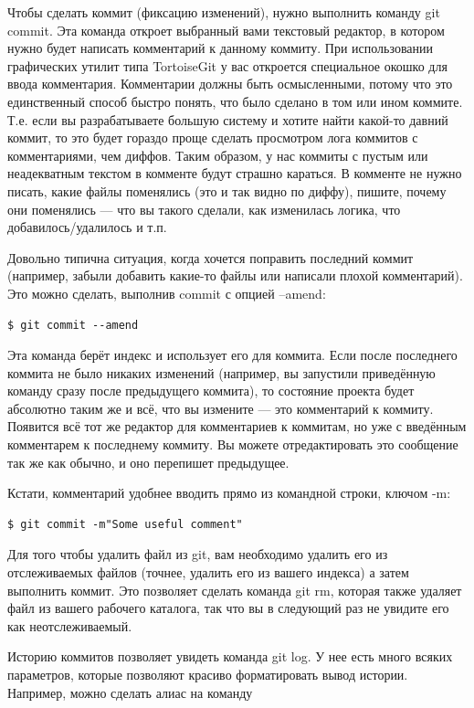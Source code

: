 \documentclass[a5paper]{article}
\begin{document}
Чтобы сделать коммит (фиксацию изменений), нужно выполнить команду git commit. Эта команда откроет выбранный вами текстовый редактор, в котором нужно будет написать комментарий к данному коммиту. При использовании графических утилит типа TortoiseGit у вас откроется специальное окошко для ввода комментария. Комментарии должны быть осмысленными, потому что это единственный способ быстро понять, что было сделано в том или ином коммите. Т.е. если вы разрабатываете большую систему и хотите найти какой-то давний коммит, то это будет гораздо проще сделать просмотром лога коммитов с комментариями, чем диффов. Таким образом, у нас коммиты с пустым или неадекватным текстом в комменте будут страшно караться. В комменте не нужно писать, какие файлы поменялись (это и так видно по диффу), пишите, почему они поменялись --- что вы такого сделали, как изменилась логика, что добавилось/удалилось и т.п.

Довольно типична ситуация, когда хочется поправить последний коммит (например, забыли добавить какие-то файлы или написали плохой комментарий). Это можно сделать, выполнив commit с опцией --amend:

\begin{verbatim}
$ git commit --amend
\end{verbatim}

Эта команда берёт индекс и использует его для коммита. Если после последнего коммита не было никаких изменений (например, вы запустили приведённую команду сразу после предыдущего коммита), то состояние проекта будет абсолютно таким же и всё, что вы измените --- это комментарий к коммиту. Появится всё тот же редактор для комментариев к коммитам, но уже с введённым комментарем к последнему коммиту. Вы можете отредактировать это сообщение так же как обычно, и оно перепишет предыдущее.

Кстати, комментарий удобнее вводить прямо из командной строки, ключом -m:

\begin{verbatim}
$ git commit -m"Some useful comment"
\end{verbatim}

Для того чтобы удалить файл из git, вам необходимо удалить его из отслеживаемых файлов (точнее, удалить его из вашего индекса) а затем выполнить коммит. Это позволяет сделать команда git rm, которая также удаляет файл из вашего рабочего каталога, так что вы в следующий раз не увидите его как неотслеживаемый.

Историю коммитов позволяет увидеть команда git log. У нее есть много всяких параметров, которые позволяют красиво форматировать вывод истории. Например, можно сделать алиас на команду 
\end{document}
